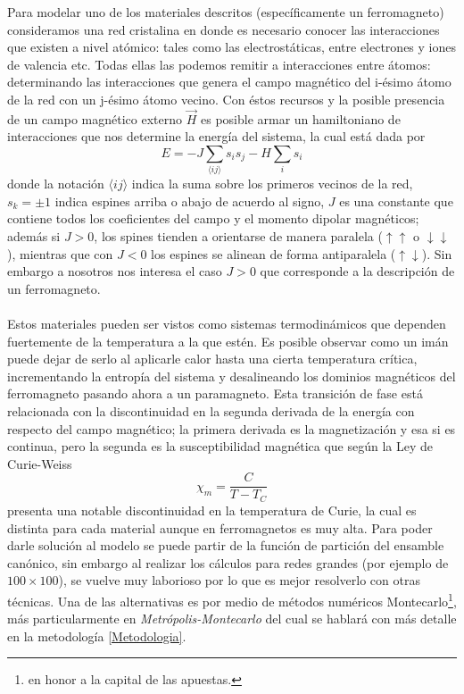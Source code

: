 \documentclass[11pt,a4paper]{article}
\begin{document}
Para modelar uno de los materiales descritos (específicamente un ferromagneto) consideramos una red cristalina en donde es necesario conocer las interacciones que existen a nivel atómico: tales como las electrostáticas, entre electrones y iones de valencia etc. Todas ellas las podemos remitir a interacciones entre átomos: determinando las interacciones que genera el campo magnético del i-ésimo átomo de la red con un j-ésimo átomo vecino. Con éstos recursos y la posible presencia de un campo magnético  externo $\vec{H}$ es posible armar un hamiltoniano de interacciones que nos determine la energía del sistema, la cual está dada por
\begin{equation}\label{eq:Energia}
E=-J\sum_{\langle ij\rangle}s_is_j-H\sum_i s_i
\end{equation}
donde la notación $\langle ij\rangle$ indica la suma sobre los primeros vecinos de la red, $s_k=\pm1$ indica espines arriba o abajo de acuerdo al signo, $J$ es una constante que contiene todos los coeficientes del campo y el momento dipolar magnéticos; además si $J>0$, los spines tienden a orientarse de manera paralela ($\uparrow\uparrow$ o $\downarrow\downarrow$), mientras que con $J<0$ los espines se alinean de forma antiparalela ($\uparrow\downarrow$). Sin embargo a nosotros nos interesa el caso $J>0$ que corresponde a la descripción de un ferromagneto.\\
\\
Estos materiales pueden ser vistos como sistemas termodinámicos que dependen fuertemente de la temperatura a la que estén. Es posible observar como un imán puede dejar de serlo al aplicarle calor hasta una cierta temperatura crítica, incrementando la entropía del sistema y desalineando los dominios magnéticos del ferromagneto pasando ahora a un paramagneto. Esta transición de fase está relacionada con la discontinuidad en la segunda derivada de la energía con respecto del campo magnético; la primera derivada es la magnetización y esa si es continua, pero la segunda es la susceptibilidad magnética que según la Ley de Curie-Weiss
\begin{equation}\label{eq:Curie-Wiess}
\chi_m=\frac{C}{T-T_C}
\end{equation}
presenta una notable discontinuidad en la temperatura de Curie, la cual es distinta para cada material aunque en ferromagnetos es muy alta. Para poder darle solución al modelo se puede partir de la función de partición del ensamble canónico, sin embargo al realizar los cálculos para redes grandes (por ejemplo de $100\times100$), se vuelve muy laborioso por lo que es mejor resolverlo con otras técnicas. Una de las alternativas es por medio de métodos numéricos Montecarlo\footnote{en honor a la capital de las apuestas.}, más particularmente en \textit{Metrópolis-Montecarlo} del cual se hablará con más detalle en la metodología \ref{Metodologia}.\\
\end{document}
